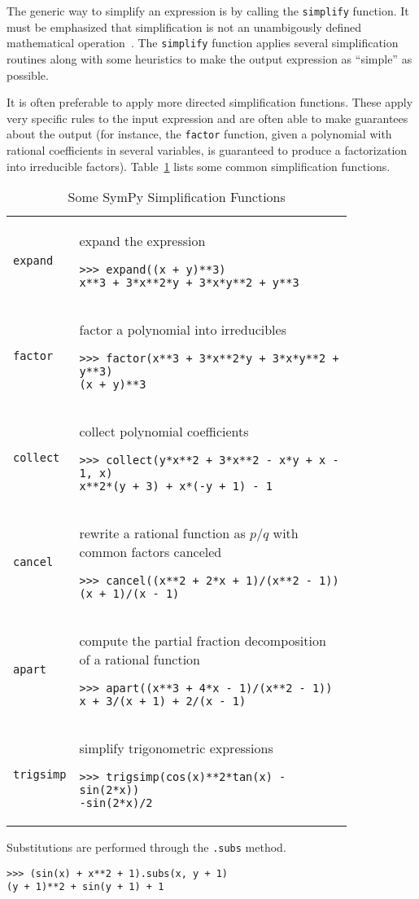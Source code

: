 




The generic way to simplify an expression is by calling the \texttt{simplify}
function.
It must be emphasized that simplification is not an unambigously defined
mathematical operation~\cite{Carette2004understanding}.
The \texttt{simplify} function applies several simplification routines along
with some heuristics to make the output expression as ``simple'' as possible.

It is often preferable to apply more directed simplification functions. These
apply very specific rules to the input expression and are often able to make
guarantees about the output (for instance, the \texttt{factor} function, given
a polynomial with rational coefficients in several variables, is guaranteed to
produce a factorization into irreducible factors). Table~\ref{simplify-table}
lists some common simplification functions.

\begin{longtable}[htbc]{lp{0.83\linewidth}}
\caption{Some SymPy Simplification Functions\label{simplify-table}}\\
\toprule
\verb|expand| & expand the expression
\begin{verbatim}
>>> expand((x + y)**3)
x**3 + 3*x**2*y + 3*x*y**2 + y**3
\end{verbatim}
\\
\verb|factor| & factor a polynomial into irreducibles
\begin{verbatim}
>>> factor(x**3 + 3*x**2*y + 3*x*y**2 + y**3)
(x + y)**3
\end{verbatim}
\\
\verb|collect| & collect polynomial coefficients
\begin{verbatim}
>>> collect(y*x**2 + 3*x**2 - x*y + x - 1, x)
x**2*(y + 3) + x*(-y + 1) - 1
\end{verbatim}
\\
\verb|cancel| & rewrite a rational function as $p/q$ with common factors
canceled
\begin{verbatim}
>>> cancel((x**2 + 2*x + 1)/(x**2 - 1))
(x + 1)/(x - 1)
\end{verbatim}
\\
\verb|apart| & compute the partial fraction decomposition of a rational function
\begin{verbatim}
>>> apart((x**3 + 4*x - 1)/(x**2 - 1))
x + 3/(x + 1) + 2/(x - 1)
\end{verbatim}
\\
\verb|trigsimp| & simplify trigonometric expressions~\cite{fu2006automated}
\begin{verbatim}
>>> trigsimp(cos(x)**2*tan(x) - sin(2*x))
-sin(2*x)/2
\end{verbatim}
\\
\bottomrule
\end{longtable}

Substitutions are performed through the \texttt{.subs} method.
\begin{verbatim}
>>> (sin(x) + x**2 + 1).subs(x, y + 1)
(y + 1)**2 + sin(y + 1) + 1
\end{verbatim}
